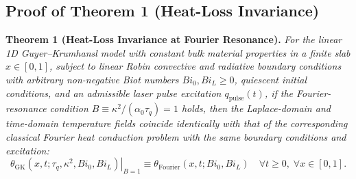 \documentclass[review,12pt]{article}
\begin{document}
\subsection{Proof of Theorem 1 (Heat-Loss Invariance)}

\textbf{Theorem 1 (Heat-Loss Invariance at Fourier Resonance).} \textit{For the linear 1D Guyer--Krumhansl model with constant bulk material properties in a finite slab $x \in [0, 1]$, subject to linear Robin convective and radiative boundary conditions with arbitrary non-negative Biot numbers $Bi_0, Bi_L \ge 0$, quiescent initial conditions, and an admissible laser pulse excitation $q_{\mathrm{pulse}}(t)$, if the Fourier-resonance condition $B \equiv \kappa^2 / (\alpha_0 \tau_q) = 1$ holds, then the Laplace-domain and time-domain temperature fields coincide identically with that of the corresponding classical Fourier heat conduction problem with the same boundary conditions and excitation:}
\begin{equation}
\left. \theta_{\mathrm{GK}}(x, t; \tau_q, \kappa^2, Bi_0, Bi_L) \right|_{B=1} \equiv \theta_{\mathrm{Fourier}}(x, t; Bi_0, Bi_L) \quad \forall t \ge 0, \; \forall x \in [0, 1].
\label{eq:theorem_statement}
\end{equation}
\end{document}
